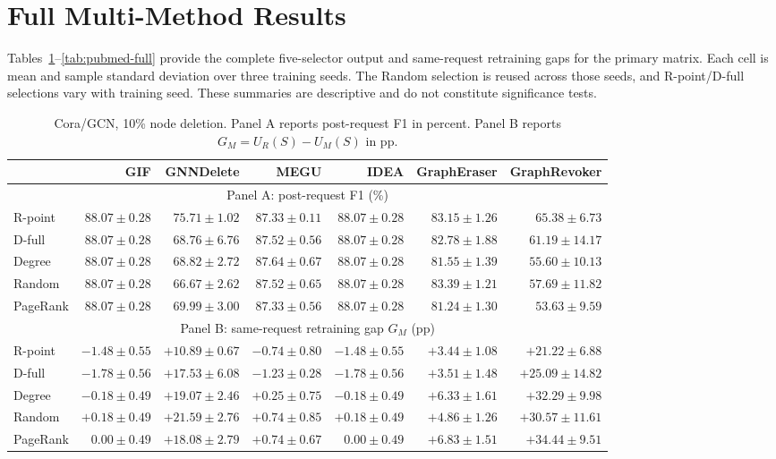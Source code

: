 \clearpage
\section{Full Multi-Method Results}
\label{app:full-matrix}

Tables~\ref{tab:cora-full}--\ref{tab:pubmed-full} provide the complete five-selector output and same-request retraining gaps for the primary matrix. Each cell is mean and sample standard deviation over three training seeds. The Random selection is reused across those seeds, and R-point/D-full selections vary with training seed. These summaries are descriptive and do not constitute significance tests.

\begin{table}[t]
\centering
\scriptsize
\setlength{\tabcolsep}{4pt}
\caption{Cora/GCN, 10\% node deletion. Panel A reports post-request F1 in percent. Panel B reports $G_M=U_R(S)-U_M(S)$ in pp.}
\label{tab:cora-full}
\begin{tabular}{lrrrrrr}
\toprule
 & GIF & GNNDelete & MEGU & IDEA & GraphEraser & GraphRevoker \\
\midrule
\multicolumn{7}{c}{Panel A: post-request F1 (\%)} \\
\midrule
R-point & $88.07\pm0.28$ & $75.71\pm1.02$ & $87.33\pm0.11$ & $88.07\pm0.28$ & $83.15\pm1.26$ & $65.38\pm6.73$ \\
D-full & $88.07\pm0.28$ & $68.76\pm6.76$ & $87.52\pm0.56$ & $88.07\pm0.28$ & $82.78\pm1.88$ & $61.19\pm14.17$ \\
Degree & $88.07\pm0.28$ & $68.82\pm2.72$ & $87.64\pm0.67$ & $88.07\pm0.28$ & $81.55\pm1.39$ & $55.60\pm10.13$ \\
Random & $88.07\pm0.28$ & $66.67\pm2.62$ & $87.52\pm0.65$ & $88.07\pm0.28$ & $83.39\pm1.21$ & $57.69\pm11.82$ \\
PageRank & $88.07\pm0.28$ & $69.99\pm3.00$ & $87.33\pm0.56$ & $88.07\pm0.28$ & $81.24\pm1.30$ & $53.63\pm9.59$ \\
\midrule
\multicolumn{7}{c}{Panel B: same-request retraining gap $G_M$ (pp)} \\
\midrule
R-point & $-1.48\pm0.55$ & $+10.89\pm0.67$ & $-0.74\pm0.80$ & $-1.48\pm0.55$ & $+3.44\pm1.08$ & $+21.22\pm6.88$ \\
D-full & $-1.78\pm0.56$ & $+17.53\pm6.08$ & $-1.23\pm0.28$ & $-1.78\pm0.56$ & $+3.51\pm1.48$ & $+25.09\pm14.82$ \\
Degree & $-0.18\pm0.49$ & $+19.07\pm2.46$ & $+0.25\pm0.75$ & $-0.18\pm0.49$ & $+6.33\pm1.61$ & $+32.29\pm9.98$ \\
Random & $+0.18\pm0.49$ & $+21.59\pm2.76$ & $+0.74\pm0.85$ & $+0.18\pm0.49$ & $+4.86\pm1.26$ & $+30.57\pm11.61$ \\
PageRank & $0.00\pm0.49$ & $+18.08\pm2.79$ & $+0.74\pm0.67$ & $0.00\pm0.49$ & $+6.83\pm1.51$ & $+34.44\pm9.51$ \\
\bottomrule
\end{tabular}
\end{table}

